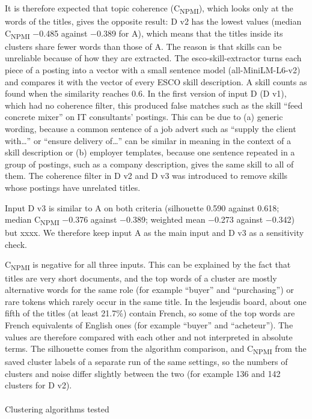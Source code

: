 \documentclass[
  letterpaper,
  DIV=11,
  numbers=noendperiod,
  sfdefaults=false]{scrartcl}
\makeatletter
\let\oldparagraph\paragraph
\renewcommand{\paragraph}{
    \@ifstar
      \xxxParagraphStar
      \xxxParagraphNoStar
  }
\newcommand{\xxxParagraphStar}[1]{\oldparagraph*{#1}\mbox{}}
\newcommand{\xxxParagraphNoStar}[1]{\oldparagraph{#1}\mbox{}}
\makeatother
\begin{document}
It is therefore expected that topic coherence (C\textsubscript{NPMI}),
which looks only at the words of the titles, gives the opposite result:
D v2 has the lowest values (median C\textsubscript{NPMI} −0.485 against
−0.389 for A), which means that the titles inside its clusters share
fewer words than those of A. The reason is that skills can be unreliable
because of how they are extracted. The esco-skill-extractor turns each
piece of a posting into a vector with a small sentence model
(all-MiniLM-L6-v2) and compares it with the vector of every ESCO skill
description. A skill counts as found when the similarity reaches 0.6. In
the first version of input D (D v1), which had no coherence filter, this
produced false matches such as the skill ``feed concrete mixer'' on IT
consultants' postings. This can be due to (a) generic wording, because a
common sentence of a job advert such as ``supply the client
with\ldots{}'' or ``ensure delivery of\ldots{}'' can be similar in
meaning in the context of a skill description or (b) employer templates,
because one sentence repeated in a group of postings, such as a company
description, gives the same skill to all of them. The coherence filter
in D v2 and D v3 was introduced to remove skills whose postings have
unrelated titles.

Input D v3 is similar to A on both criteria (silhouette 0.590 against
0.618; median C\textsubscript{NPMI} −0.376 against −0.389; weighted mean
−0.273 against −0.342) but xxxx. We therefore keep input A as the main
input and D v3 as a sensitivity check.

C\textsubscript{NPMI} is negative for all three inputs. This can be
explained by the fact that titles are very short documents, and the top
words of a cluster are mostly alternative words for the same role (for
example ``buyer'' and ``purchasing'') or rare tokens which rarely occur
in the same title. In the lesjeudis board, about one fifth of the titles
(at least 21.7\%) contain French, so some of the top words are French
equivalents of English ones (for example ``buyer'' and ``acheteur'').
The values are therefore compared with each other and not interpreted in
absolute terms. The silhouette comes from the algorithm comparison, and
C\textsubscript{NPMI} from the saved cluster labels of a separate run of
the same settings, so the numbers of clusters and noise differ slightly
between the two (for example 136 and 142 clusters for D v2).

\paragraph{Clustering algorithms
tested}\label{clustering-algorithms-tested}
\end{document}

